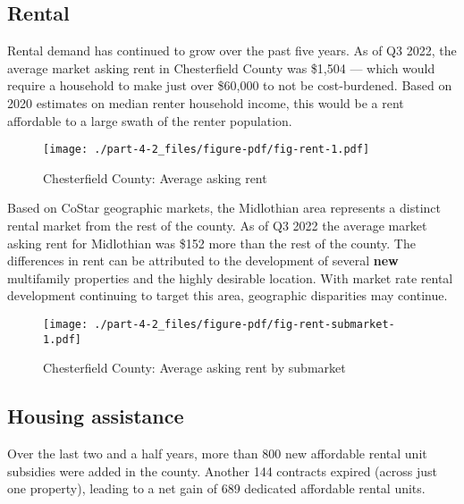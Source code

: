 \documentclass[
  letterpaper,
  DIV=11,
  numbers=noendperiod]{scrreprt}
\begin{document}
\hypertarget{rental-1}{%
\subsection{Rental}\label{rental-1}}

Rental demand has continued to grow over the past five years. As of Q3
2022, the average market asking rent in Chesterfield County was \$1,504
--- which would require a household to make just over \$60,000 to not be
cost-burdened. Based on 2020 estimates on median renter household
income, this would be a rent affordable to a large swath of the renter
population.

\begin{figure}

{\centering \texttt{[image: ./part-4-2\_files/figure-pdf/fig-rent-1.pdf]}

}

\caption{\label{fig-rent}Chesterfield County: Average asking rent}

\end{figure}

Based on CoStar geographic markets, the Midlothian area represents a
distinct rental market from the rest of the county. As of Q3 2022 the
average market asking rent for Midlothian was \$152 more than the rest
of the county. The differences in rent can be attributed to the
development of several \textbf{new} multifamily properties and the
highly desirable location. With market rate rental development
continuing to target this area, geographic disparities may continue.

\begin{figure}

{\centering \texttt{[image: ./part-4-2\_files/figure-pdf/fig-rent-submarket-1.pdf]}

}

\caption{\label{fig-rent-submarket}Chesterfield County: Average asking
rent by submarket}

\end{figure}

\hypertarget{housing-assistance-1}{%
\subsection{Housing assistance}\label{housing-assistance-1}}

Over the last two and a half years, more than 800 new affordable rental
unit subsidies were added in the county. Another 144 contracts expired
(across just one property), leading to a net gain of 689 dedicated
affordable rental units.
\end{document}
